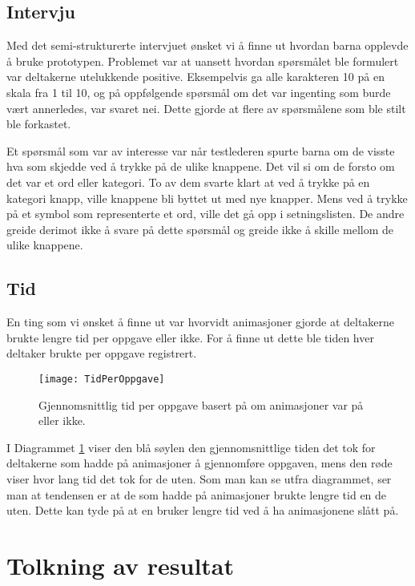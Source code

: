 \subsection{Intervju} 
 
Med det semi-strukturerte intervjuet ønsket vi å finne ut hvordan barna opplevde å bruke prototypen. Problemet var at uansett hvordan spørsmålet ble formulert var deltakerne utelukkende positive. Eksempelvis ga alle karakteren 10 på en skala fra 1 til 10, og på oppfølgende spørsmål om det var ingenting som burde vært annerledes, var svaret nei. Dette gjorde at flere av spørsmålene som ble stilt ble forkastet.  
 
Et spørsmål som var av interesse var når testlederen spurte barna om de visste hva som skjedde ved å trykke på de ulike knappene. Det vil si om de forsto om det var et ord eller kategori. To av dem svarte klart at ved å trykke på en kategori knapp, ville knappene bli byttet ut med nye knapper. Mens ved å trykke på et symbol som representerte et ord, ville det gå opp i setningslisten. De andre greide derimot ikke å svare på dette spørsmål og greide ikke å skille mellom de ulike knappene. 
 

\subsection{Tid} 
 
 
En ting som vi ønsket å finne ut var hvorvidt animasjoner gjorde at deltakerne brukte lengre tid per oppgave eller ikke. For å finne ut dette ble tiden hver deltaker brukte per oppgave registrert.  
 
 
\begin{figure}[ht!] 
\centering 
\texttt{[image: TidPerOppgave]} 
\caption{Gjennomsnittlig tid per oppgave basert på om animasjoner var på eller ikke.} 
\label{fig:DiagramTidPerOppgave} 
\end{figure} 
 
 
I Diagrammet \ref{fig:DiagramTidPerOppgave} viser den blå søylen den gjennomsnittlige tiden det tok for deltakerne som hadde på animasjoner å gjennomføre oppgaven, mens den røde viser hvor lang tid det tok for de uten. Som man kan se utfra diagrammet, ser man at tendensen er at de som hadde på animasjoner brukte lengre tid en de uten. Dette kan tyde på at en bruker lengre tid ved å ha animasjonene slått på.  
 
 
 
\section{Tolkning av resultat} 
 

